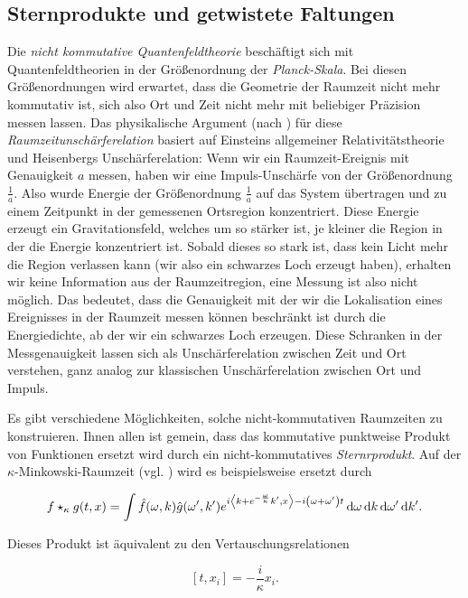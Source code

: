 \subsection{Sternprodukte und getwistete Faltungen}
Die \emph{nicht kommutative Quantenfeldtheorie} beschäftigt sich mit Quantenfeldtheorien in der Größenordnung der \emph{Planck-Skala}. Bei diesen Größenordnungen wird erwartet, dass die Geometrie der Raumzeit nicht mehr kommutativ ist, sich also Ort und Zeit nicht mehr mit beliebiger Präzision messen lassen. Das physikalische Argument (nach \textcite{Doplicher1995}) für diese \emph{Raumzeitunschärferelation} basiert auf Einsteins allgemeiner Relativitätstheorie und Heisenbergs Unschärferelation: Wenn wir ein Raumzeit-Ereignis mit Genauigkeit $a$ messen, haben wir eine Impuls-Unschärfe von der Größenordnung $\frac{1}{a}$. Also wurde Energie der Größenordnung $\frac{1}{a}$ auf das System übertragen und zu einem Zeitpunkt in der gemessenen Ortsregion konzentriert. Diese Energie erzeugt ein Gravitationsfeld, welches um so stärker ist, je kleiner die Region in der die Energie konzentriert ist. Sobald dieses so stark ist, dass kein Licht mehr die Region verlassen kann (wir also ein schwarzes Loch erzeugt haben), erhalten wir keine Information aus der Raumzeitregion, eine Messung ist also nicht möglich. Das bedeutet, dass die Genauigkeit mit der wir die Lokalisation eines Ereignisses in der Raumzeit messen können beschränkt ist durch die Energiedichte, ab der wir ein schwarzes Loch erzeugen. Diese Schranken in der Messgenauigkeit lassen sich als Unschärferelation zwischen Zeit und Ort verstehen, ganz analog zur klassischen Unschärferelation zwischen Ort und Impuls.

Es gibt verschiedene Möglichkeiten, solche nicht-kommutativen Raumzeiten zu konstruieren. Ihnen allen ist gemein, dass das kommutative punktweise Produkt von Funktionen ersetzt wird durch ein nicht-kommutatives \emph{Sternrprodukt}.
Auf der $\kappa$-Minkowski-Raumzeit (vgl. \textcite{kappaMinkowski}) wird es beispielsweise ersetzt durch

\begin{equation*}
    f \star_\kappa g (t,x) =
    \int \hat f(\omega,k) \hat g(\omega',k')
    e^{i \left<k + e^{-\frac{\omega}{\kappa}}k',x\right> - i\left(\omega+\omega' \right)t}
    \mathop{}\!\mathrm{d} \omega \mathop{}\!\mathrm{d} k \mathop{}\!\mathrm{d} \omega' \mathop{}\!\mathrm{d} k'.
\end{equation*}

Dieses Produkt ist äquivalent zu den Vertauschungsrelationen

\begin{equation*}
    \left[t,x_i\right] = -\frac{i}{\kappa} x_i.
\end{equation*}



